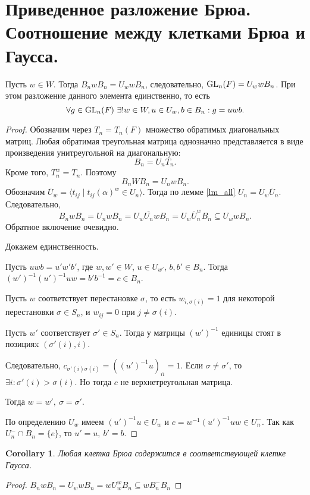 \documentclass[11pt]{book}
\newcommand{\GL}{{\mathop{\text{\rm GL}}}}
\theoremstyle{definition}
\theoremstyle{plain}
\theoremstyle{plain}
\newtheorem{cor}{Corollary}
\theoremstyle{definition}
\theoremstyle{remark}
\begin{document}
\section{Приведенное разложение Брюа. Соотношение между клетками Брюа и Гаусса.}
\begin{thm}
    Пусть $ w \in W$. Тогда $ B_n w B_n = U_w w B_n$, следовательно,  $ \GL _n(F) = U_w wB_n$. При этом разложение данного элемента единственно, то есть 
    \[
	\forall  g \in \GL_n(F) ~\exists ! w \in W, u \in U_w , b \in B_n: g = uwb
    .\] 
\end{thm}
\begin{proof}
    Обозначим через $ T_n = T_n(F)$ множество обратимых диагональных матриц. Любая обратимая треугольная матрица однозначно представляется в виде произведения унитреугольной на диагональную:
     \[
    B_{n} = U_{n} T_n 
    .\] 
    Кроме того, $ T_n^{w} = T_n$. Поэтому
    \[
    B_n W B_n = U_n w B_n
    .\] 
Обозначим $ \overline{U}_w = \langle t_{ij} \mid t_{ij}(\alpha)^{w} \in U_n \rangle$. Тогда по лемме \ref{lm_all} $ U_n = U_w \overline{U}_n$. Следовательно, 
    \[
    B_n w B_n = U_n w B_n = U_w \overline{U_n}w B_n = U_w \overline{U}_n^{w} B_n \subseteq U_w w B_n
    .\] 
    Обратное включение очевидно.

    Докажем единственность.

    Пусть $ uwb = u'w'b'$, где  $ w, w' \in W$, $ u \in U_{w'}$, $ b, b' \in B_n$. Тогда $ (w')^{-1}(u')^{-1} u w = b'b^{-1} = c \in B_n$.

    Пусть $ w$ соответствует перестановке $ \sigma$, то есть  $ w_{i, \sigma(i)} = 1$ для некоторой перестановки $ \sigma \in S_n$, и $ w_{ij} = 0$ при $ j \ne  \sigma(i)$.  

    Пусть $ w'$ соответствует $ \sigma' \in S_n$. Тогда у матрицы $ (w')^{-1}$ единицы стоят в позицияx  $ (\sigma'(i), i)$.  

    Следовательно, $ c_{\sigma'(i) \sigma(i)} = \left( (u')^{-1}u \right)_{ii} = 1 $. Если $ \sigma\ne \sigma'$, то $ \exists  i: \sigma'(i) > \sigma(i)$. Но тогда $ c$ не верхнетреугольная матрица.

    Тогда $ w = w', ~ \sigma = \sigma'$.

    По определению $ U_w$ имеем  $ (u')^{-1}  u \in U_w$ и $ c = w^{-1} (u')^{-1}uw \in U_{n}^{-}$. Так как $ U_n^{-} \cap B_n = \{e\}$, то $ u' = u , ~ b' = b$.  
\end{proof}
\begin{cor}
    Любая клетка Брюа содержится в соответствующей клетке Гаусса.
\end{cor}
\begin{proof}
    $ B_n wB_n = U_{w} w B_n = w U_w^{w} B_n \subseteq w B_n^{-} B_n$
\end{proof}
\end{document}
